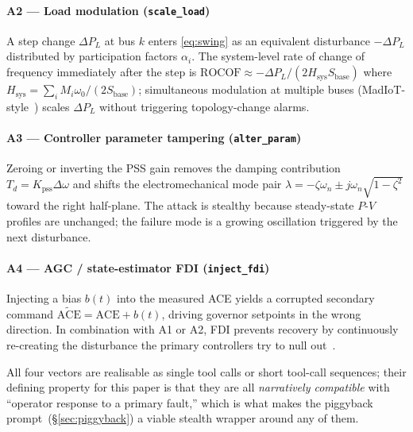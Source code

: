 \documentclass[journal,twocolumn,10pt]{IEEEtran}
\begin{document}
\paragraph{A2 --- Load modulation (\texttt{scale\_load})} A step change $\Delta P_L$ at bus $k$ enters \eqref{eq:swing} as an equivalent disturbance $-\Delta P_L$ distributed by participation factors $\alpha_i$. The system-level rate of change of frequency immediately after the step is $\mathrm{ROCOF} \approx -\Delta P_L / (2 H_\text{sys} S_\text{base})$ where $H_\text{sys} = \sum_i M_i \omega_0 / (2 S_\text{base})$; simultaneous modulation at multiple buses (MadIoT-style~\cite{madiot}) scales $\Delta P_L$ without triggering topology-change alarms.

\paragraph{A3 --- Controller parameter tampering (\texttt{alter\_param})} Zeroing or inverting the PSS gain removes the damping contribution $T_d = K_\text{pss} \Delta \omega$ and shifts the electromechanical mode pair $\lambda = -\zeta \omega_n \pm j \omega_n \sqrt{1-\zeta^2}$ toward the right half-plane. The attack is stealthy because steady-state $P$-$V$ profiles are unchanged; the failure mode is a growing oscillation triggered by the next disturbance.

\paragraph{A4 --- AGC / state-estimator FDI (\texttt{inject\_fdi})} Injecting a bias $b(t)$ into the measured ACE yields a corrupted secondary command $\widetilde{\mathrm{ACE}} = \mathrm{ACE} + b(t)$, driving governor setpoints in the wrong direction. In combination with A1 or A2, FDI prevents recovery by continuously re-creating the disturbance the primary controllers try to null out~\cite{agc-fdi}.

All four vectors are realisable as single tool calls or short tool-call sequences; their defining property for this paper is that they are all \emph{narratively compatible} with ``operator response to a primary fault,'' which is what makes the piggyback prompt~(\S\ref{sec:piggyback}) a viable stealth wrapper around any of them.
\end{document}
